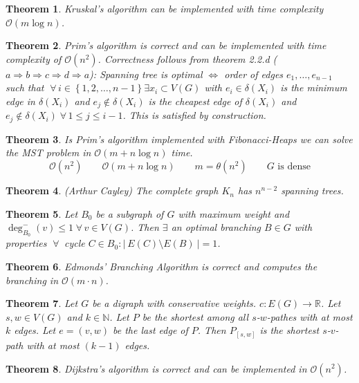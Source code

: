 \documentclass{article}
\newtheorem{theorem}{Theorem}
\newcommand{\card}[1]{\left|\:\!#1\:\!\right|}
\newcommand{\set}[1]{\left\{#1\right\}}
\newcommand{\gath}[2]{$#1$-$#2$-path} %
\newcommand{\fall}{\;\forall\,}
\begin{document}
\begin{theorem}\label{satz-2.5}
  Kruskal's algorithm can be implemented with time complexity $\mathcal{O}(m \log{n})$.
\end{theorem}
\begin{theorem}\label{satz-2.6}
  Prim's algorithm is correct and can be implemented with time complexity of $\mathcal{O}(n^2)$.
  Correctness follows from theorem 2.2.d ($a \Rightarrow b \Rightarrow c \Rightarrow d \Rightarrow a$):
    Spanning tree is optimal $\Leftrightarrow$ order of edges $e_1, \ldots, e_{n-1}$ such that
    $\fall i \in \set{1, 2, \ldots, n-1} \exists x_i \subset V(G)$ with $e_i \in \delta(X_i)$
    is the minimum edge in $\delta(X_i)$ and $e_j \notin \delta(X_i)$ is the cheapest edge of $\delta(X_i)$
    and $e_j \notin \delta(X_i) \fall 1 \leq j \leq i-1$. This is satisfied by construction.
\end{theorem}
\begin{theorem}\label{satz-2.7}
  Is Prim's algorithm implemented with Fibonacci-Heaps we can solve the MST problem in $\mathcal{O}(m + n\log{n})$ time.
  \[
    \mathcal{O}(n^2) \qquad \mathcal{O}(m + n\log{n}) \qquad m = \theta(n^2) \qquad G \text{ is dense}
  \]
\end{theorem}
\begin{theorem}\label{satz-2.8}
  (Arthur Cayley)
  The complete graph $K_n$ has $n^{n-2}$ spanning trees.
\end{theorem}
\begin{theorem}\label{lemma-2.10}
  Let $B_0$ be a subgraph of $G$ with maximum weight and $\deg^-_{B_0}(v) \leq 1 \fall v \in V(G)$.
  Then $\exists$ an optimal branching $B \in G$ with properties $\fall$ cycle $C \in B_0: \card{E(C) \setminus E(B)} = 1$.
\end{theorem}
\begin{theorem}\label{satz-2.11}
Edmonds' Branching Algorithm is correct and computes the branching in $\mathcal{O}(m\cdot n)$.
\end{theorem}
\begin{theorem}\label{proposition-3.1}
Let $G$ be a digraph with conservative weights. $c: E(G) \rightarrow \mathbb{R}$. Let $s, w \in V(G)$ and $k \in \mathbb{N}$. Let $P$ be the shortest among all \gath swes with at most $k$ edges. Let $e = (v, w)$ be the last edge of $P$. Then $P_{[s, w]}$ is the shortest \gath sv with at most $(k-1)$ edges.
\end{theorem}
\begin{theorem}\label{satz-3.2}
  Dijkstra's algorithm is correct and can be implemented in $\mathcal{O}(n^2)$.
\end{theorem}
\end{document}
